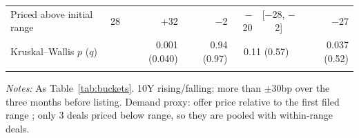 \begin{table}[!htbp]
\begin{threeparttable}
\begin{tabular}{lrrrrcr}
\quad Priced above initial range & 28 & +32 & $-$2 & $-$20 & [$-$28, $-$2] & $-$27 \\
\quad \footnotesize Kruskal--Wallis $p$ ($q$) & & \footnotesize 0.001 (0.040) & \footnotesize 0.94 (0.97) & \multicolumn{2}{c}{\footnotesize 0.11 (0.57)} & \footnotesize 0.037 (0.52) \\
\addlinespace
\bottomrule
\end{tabular}
\begin{tablenotes}[flushleft]\footnotesize
\item \textit{Notes:} As Table~\ref{tab:buckets}. 10Y rising/falling: more than $\pm$30bp over the three months before listing. Demand proxy: offer price relative to the first filed range \citep{hanley1993}; only 3 deals priced below range, so they are pooled with within-range deals.
\end{tablenotes}
\end{threeparttable}

\end{table}

